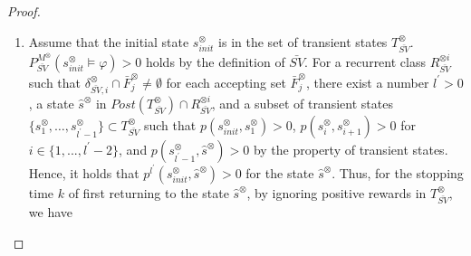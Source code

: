 \documentclass[10pt]{article}
\theoremstyle{definition}
\begin{document}
\begin{proof}
\begin{enumerate}
  \item Assume that the initial state $s^{\otimes}_{init}$ is in the set of transient states $T_{\bar{SV}}^{\otimes}$.$P^{M^{\otimes}}_{\bar{SV}}(s^{\otimes}_{init} \models \varphi) > 0$ holds by the definition of $\bar{SV}$. For a recurrent class $R^{\otimes i}_{\bar{SV}}$ such that $\delta^{\otimes}_{\bar{SV}, i} \cap \bar{F}^{\otimes}_j \neq \emptyset$ for each accepting set
    $\bar{F}^{\otimes}_j$, there exist a number $l^{\prime} > 0$, a state $\hat{s}^{\otimes}$ in $Post(T^{\otimes}_{\bar{SV}}) \cap R^{\otimes i}_{\bar{SV}}$, and a subset of transient states $\{ s^{\otimes}_1, \ldots , s^{\otimes}_{l^{\prime}-1} \} \subset T^{\otimes}_{\bar{SV}}$ such that $p(s^{\otimes}_{init}, s^{\otimes}_1)>0$, $p(s^{\otimes}_{i}, s^{\otimes}_{i+1})>0$ for $i \in \{ 1,...,l^{\prime}-2 \}$, and $p(s^{\otimes}_{l^{\prime}-1}, \hat{s}^{\otimes})>0$ by the property of transient states.
    Hence, it holds that $p^{l^{\prime}}(s^{\otimes}_{init}, \hat{s}^{\otimes}) > 0$ for the state $\hat{s}^{\otimes}$. Thus, for the stopping time $k$ of first returning to the state $\hat{s}^{\otimes}$, by ignoring positive rewards in $T^{\otimes}_{\bar{SV}}$, we have



\end{enumerate}
\end{proof}
\end{document}
